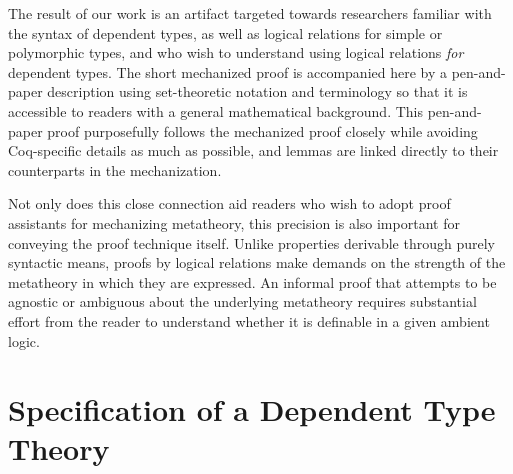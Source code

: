 \documentclass[\ifpublic nolinenum\else\fi,online,OA]{jfp}
\theoremstyle{definition}
\begin{document}
The result of our work is an artifact targeted towards researchers
familiar with the syntax of dependent types, as well as logical relations
for simple or polymorphic types, and who wish to understand using logical
relations \emph{for} dependent types.
The short mechanized proof is accompanied here by a pen-and-paper description
using set-theoretic notation and terminology so that it is accessible to
readers with a general mathematical background. This pen-and-paper proof
purposefully follows the mechanized proof closely while avoiding Coq-specific
details as much as possible, and lemmas are linked directly to their
counterparts in the mechanization.

Not only does this close connection aid readers who wish to adopt proof
assistants for mechanizing metatheory, this precision is also important for
conveying the proof technique itself. Unlike properties derivable through
purely syntactic means, proofs by logical relations make demands on the
strength of the metatheory in which they are expressed. An informal proof that
attempts to be agnostic or ambiguous about the underlying metatheory requires
substantial effort from the reader to understand whether it is definable in a
given ambient logic.


\section{Specification of a Dependent Type Theory}
\label{sec:spec}
\end{document}
